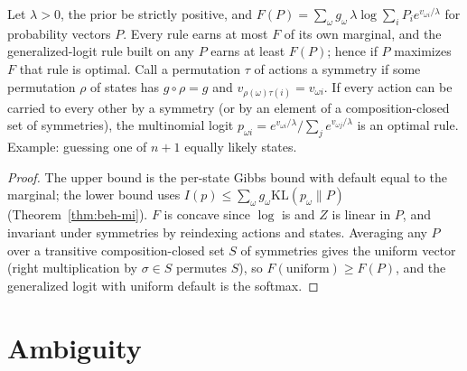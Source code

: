 \begin{theorem}
\label{thm:beh-ri-sym}
\leanok
{}
Let $\lambda>0$, the prior be strictly positive, and $F(P)=\sum_\omega g_\omega\,\lambda\log\sum_iP_ie^{v_{\omega i}/\lambda}$
for probability vectors $P$. Every rule earns at most $F$ of its own marginal, and the generalized-logit rule built on
any $P$ earns at least $F(P)$; hence if $P$ maximizes $F$ that rule is optimal. Call a permutation $\tau$ of actions a
symmetry if some permutation $\rho$ of states has $g\circ\rho=g$ and $v_{\rho(\omega)\tau(i)}=v_{\omega i}$. If every action
can be carried to every other by a symmetry (or by an element of a composition-closed set of symmetries), the multinomial
logit $p_{\omega i}=e^{v_{\omega i}/\lambda}/\sum_je^{v_{\omega j}/\lambda}$ is an optimal rule. Example: guessing one of
$n+1$ equally likely states.
\end{theorem}
\begin{proof}
\leanok
The upper bound is the per-state Gibbs bound with default equal to the marginal; the lower bound uses
$I(p)\le\sum_\omega g_\omega\mathrm{KL}(p_\omega\|P)$ (Theorem~\ref{thm:beh-mi}). $F$ is concave since $\log$ is and $Z$ is linear in
$P$, and invariant under symmetries by reindexing actions and states. Averaging any $P$ over a transitive
composition-closed set $S$ of symmetries gives the uniform vector (right multiplication by $\sigma\in S$ permutes $S$),
so $F(\text{uniform})\ge F(P)$, and the generalized logit with uniform default is the softmax.
\end{proof}

\section{Ambiguity}
\label{sec:beh-ambiguity}

